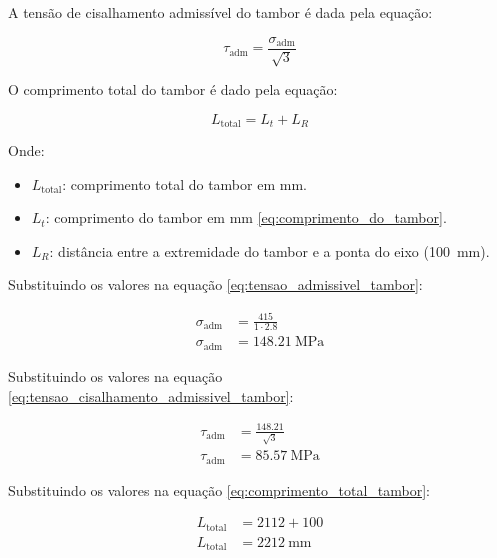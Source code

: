 A tensão de cisalhamento admissível do tambor é dada pela equação:

\begin{equation}
  \tau_{\text{adm}} = \frac{\sigma_{\text{adm}}}{\sqrt{3}}
  \label{eq:tensao_cisalhamento_admissivel_tambor}
\end{equation}

O comprimento total do tambor é dado pela equação:

\begin{equation}
  L_{\text{total}} = L_t + L_R
  \label{eq:comprimento_total_tambor}
\end{equation}

Onde:

\begin{itemize}
  \item $L_{\text{total}}$: comprimento total do tambor em \si{\milli\meter}.
  \item $L_t$: comprimento do tambor em \si{\milli\meter} \eqref{eq:comprimento_do_tambor}.
  \item $L_R$: distância entre a extremidade do tambor e a ponta do eixo (\SI{100}{\milli\meter}).
\end{itemize}

\vspace{1em}

Substituindo os valores na equação \eqref{eq:tensao_admissivel_tambor}:

\begin{align*}
  \sigma_{\text{adm}} & = \frac{415}{1 \cdot \num{2.8}}     \\
  \sigma_{\text{adm}} & = \boxed{\SI{148.21}{\mega\pascal}}
\end{align*}

Substituindo os valores na equação \eqref{eq:tensao_cisalhamento_admissivel_tambor}:

\begin{align*}
  \tau_{\text{adm}} & = \frac{\num{148.21}}{\sqrt{3}}    \\
  \tau_{\text{adm}} & = \boxed{\SI{85.57}{\mega\pascal}}
\end{align*}

Substituindo os valores na equação \eqref{eq:comprimento_total_tambor}:

\begin{align*}
  L_{\text{total}} & = 2112 + 100                      \\
  L_{\text{total}} & = \boxed{\SI{2212}{\milli\meter}}
\end{align*}

